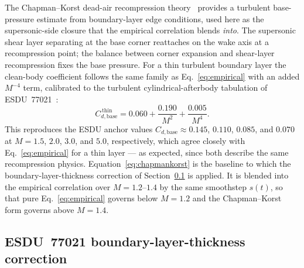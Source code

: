 The Chapman--Korst dead-air recompression theory~\cite{chapman1955} provides a
turbulent base-pressure estimate from boundary-layer edge conditions, used here
as the supersonic-side closure that the empirical correlation blends \emph{into}.
The supersonic shear layer separating at the base corner reattaches on the wake
axis at a recompression point; the balance between corner expansion and
shear-layer recompression fixes the base pressure. For a thin turbulent boundary
layer the clean-body coefficient follows the same family as
Eq.~\eqref{eq:empirical} with an added $M^{-4}$ term, calibrated to the turbulent
cylindrical-afterbody tabulation of ESDU~77021~\cite{esdu77021}:
%
\begin{equation}
C_{d,\text{base}}^{\,\text{thin}} = 0.060 + \frac{0.190}{M^{2}}
   + \frac{0.005}{M^{4}} .
\label{eq:chapmankorst}
\end{equation}
%
This reproduces the ESDU anchor values $C_{d,\text{base}} \approx 0.145$, $0.110$,
$0.085$, and $0.070$ at $M = 1.5$, $2.0$, $3.0$, and $5.0$, respectively, which
agree closely with Eq.~\eqref{eq:empirical} for a thin layer --- as expected,
since both describe the same recompression physics. Equation~\eqref{eq:chapmankorst}
is the baseline to which the boundary-layer-thickness correction of
Section~\ref{subsec:esdu} is applied. It is blended into the empirical correlation
over $M = 1.2$--$1.4$ by the same smoothstep $s(t)$, so that pure
Eq.~\eqref{eq:empirical} governs below $M = 1.2$ and the Chapman--Korst form
governs above $M = 1.4$.

\subsection{ESDU~77021 boundary-layer-thickness correction}
\label{subsec:esdu}

